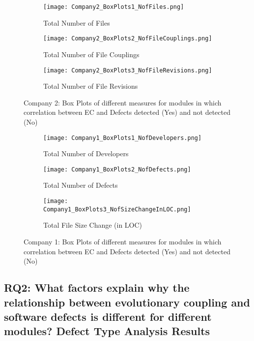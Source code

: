 \documentclass[times]{smrauth}
\begin{document}
\begin{figure}
\begin{subfigure}[b]{0.33\textwidth}
  \texttt{[image: Company2\_BoxPlots1\_NofFiles.png]}
  \caption{Total Number of Files}
  \label{fig:Cmpny2fig1}
\end{subfigure}%
\begin{subfigure}[b]{0.33\textwidth}
  \texttt{[image: Company2\_BoxPlots2\_NofFileCouplings.png]}
  \caption{Total Number of File Couplings}
  \label{fig:Cmpny2fig2}
\end{subfigure}
\begin{subfigure}[b]{0.33\textwidth}
  \texttt{[image: Company2\_BoxPlots3\_NofFileRevisions.png]}
  \caption{Total Number of File Revisions}
  \label{fig:Cmpny2fig3}
\end{subfigure}
\caption{Company 2: Box Plots of different measures for modules in which correlation between EC and Defects detected (Yes) and not detected (No)}
\label{fig:Cmpny2BoxPlots}
\end{figure}

\begin{figure}
\begin{subfigure}[b]{0.33\textwidth}
  \texttt{[image: Company1\_BoxPlots1\_NofDevelopers.png]}
  \caption{Total Number of Developers}
  \label{fig:Cmpny1fig4}
\end{subfigure}%
\begin{subfigure}[b]{0.33\textwidth}
  \texttt{[image: Company1\_BoxPlots2\_NofDefects.png]}
  \caption{Total Number of Defects}
  \label{fig:Cmpny1fig5}
\end{subfigure}
\begin{subfigure}[b]{0.33\textwidth}
  \texttt{[image: Company1\_BoxPlots3\_NofSizeChangeInLOC.png]}
  \caption{Total File Size Change (in LOC)}
  \label{fig:Cmpny1fig6}
\end{subfigure}
\caption{Company 1: Box Plots of different measures for modules in which correlation between EC and Defects detected (Yes) and not detected (No)}
\label{fig:Cmpny1BoxPlots2}
\end{figure}


\subsection{RQ2: What factors explain why the relationship between evolutionary coupling and software defects is different for different modules? Defect Type Analysis Results} 		
\end{document}
